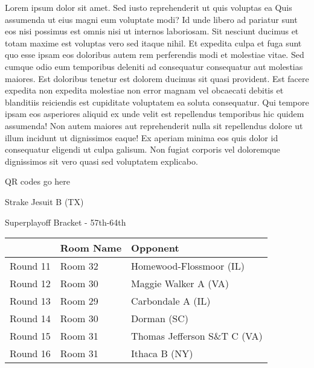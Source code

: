 \documentclass{article}%
\begin{document}
\vspace*{8pt}%
\linebreak%
\newline%
\newline%
    Lorem ipsum dolor sit amet. Sed iusto reprehenderit ut quis voluptas ea Quis assumenda ut eius magni eum voluptate modi? Id unde libero ad pariatur sunt eos nisi possimus est omnis nisi ut internos laboriosam. Sit nesciunt ducimus et totam maxime est voluptas vero sed itaque nihil. Et expedita culpa et fuga sunt quo esse ipsam eos doloribus autem rem perferendis modi et molestiae vitae.\newline%
\newline%
    Sed cumque odio eum temporibus deleniti ad consequatur consequatur aut molestias maiores. Est doloribus tenetur est dolorem ducimus sit quasi provident. Est facere expedita non expedita molestiae non error magnam vel obcaecati debitis et blanditiis reiciendis est cupiditate voluptatem ea soluta consequatur. Qui tempore ipsam eos asperiores aliquid ex unde velit est repellendus temporibus hic quidem assumenda!\newline%
\newline%
    Non autem maiores aut reprehenderit nulla sit repellendus dolore ut illum incidunt ut dignissimos eaque! Ex aperiam minima eos quis dolor id consequatur eligendi ut culpa galisum. Non fugiat corporis vel doloremque dignissimos sit vero quasi sed voluptatem explicabo.\newline%
\newline%
\vspace*{30pt}%
\begin{center}%
\begin{Huge}%
QR codes go here%
\end{Huge}%
\end{center}%
\newpage%
\begin{center}%
\begin{Huge}%
Strake Jesuit B (TX)%
\end{Huge}%
\vspace*{8pt}%
\linebreak%
\begin{Large}%
Superplayoff Bracket {-} 57th{-}64th%
\end{Large}%
\end{center}%
%
\begin{tabularx}{\textwidth}{|c|Y|Y|}%
\hline%
&Room Name&Opponent\\%
\hline%
Round 11&Room 32&Homewood{-}Flossmoor (IL)\\%
Round 12&Room 30&Maggie Walker A (VA)\\%
Round 13&Room 29&Carbondale A (IL)\\%
Round 14&Room 30&Dorman (SC)\\%
Round 15&Room 31&Thomas Jefferson S\&T C (VA)\\%
Round 16&Room 31&Ithaca B (NY)\\%
\hline%
\end{tabularx}%
\end{document}
